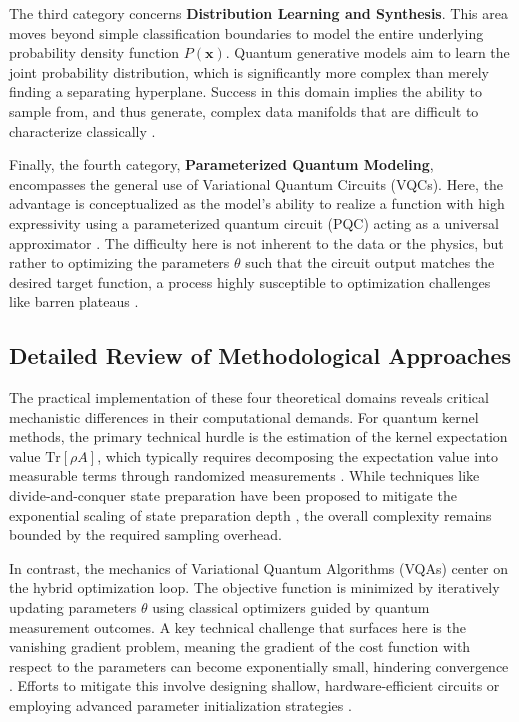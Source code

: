 \documentclass{article}
\begin{document}
The third category concerns \textbf{Distribution Learning and Synthesis}. This area moves beyond simple classification boundaries to model the entire underlying probability density function $P(\mathbf{x})$. Quantum generative models aim to learn the joint probability distribution, which is significantly more complex than merely finding a separating hyperplane. Success in this domain implies the ability to sample from, and thus generate, complex data manifolds that are difficult to characterize classically \cite{zhu2022generative}.

Finally, the fourth category, \textbf{Parameterized Quantum Modeling}, encompasses the general use of Variational Quantum Circuits (VQCs). Here, the advantage is conceptualized as the model's ability to realize a function with high expressivity using a parameterized quantum circuit (PQC) acting as a universal approximator \cite{cerezo2021variational}. The difficulty here is not inherent to the data or the physics, but rather to optimizing the parameters $\theta$ such that the circuit output matches the desired target function, a process highly susceptible to optimization challenges like barren plateaus \cite{cerezo2021cost}.

\subsection{Detailed Review of Methodological Approaches}

\label{sec:detailed\_review\_of\_methodological\_approa}

The practical implementation of these four theoretical domains reveals critical mechanistic differences in their computational demands. For quantum kernel methods, the primary technical hurdle is the estimation of the kernel expectation value $\text{Tr}[\rho A]$, which typically requires decomposing the expectation value into measurable terms through randomized measurements \cite{haug2023quantum}. While techniques like divide-and-conquer state preparation have been proposed to mitigate the exponential scaling of state preparation depth \cite{araujo2021divideandconquer}, the overall complexity remains bounded by the required sampling overhead.

In contrast, the mechanics of Variational Quantum Algorithms (VQAs) center on the hybrid optimization loop. The objective function is minimized by iteratively updating parameters $\theta$ using classical optimizers guided by quantum measurement outcomes. A key technical challenge that surfaces here is the vanishing gradient problem, meaning the gradient of the cost function with respect to the parameters can become exponentially small, hindering convergence \cite{cerezo2021cost}. Efforts to mitigate this involve designing shallow, hardware-efficient circuits or employing advanced parameter initialization strategies \cite{wang2024trainability}.
\end{document}
